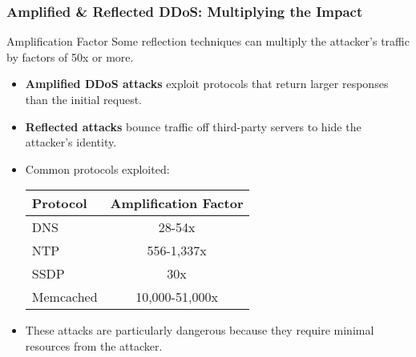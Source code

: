 \documentclass{beamer}
\begin{document}
\begin{frame}
    \frametitle{Amplified \& Reflected DDoS: Multiplying the Impact}
    
    \begin{alertblock}{Amplification Factor}
        Some reflection techniques can multiply the attacker's traffic by factors of 50x or more.
    \end{alertblock}
    
    \begin{itemize}
        \item \textbf{Amplified DDoS attacks} exploit protocols that return larger responses than the initial request.
        \item \textbf{Reflected attacks} bounce traffic off third-party servers to hide the attacker's identity.
        \item Common protocols exploited:
        
        \begin{tabular}{l|c}
            \textbf{Protocol} & \textbf{Amplification Factor} \\
            \hline
            DNS & 28-54x \\
            NTP & 556-1,337x \\
            SSDP & 30x \\
            Memcached & 10,000-51,000x \\
        \end{tabular}
        
        \item These attacks are particularly dangerous because they require minimal resources from the attacker.
    \end{itemize}
\end{frame}
\end{document}
